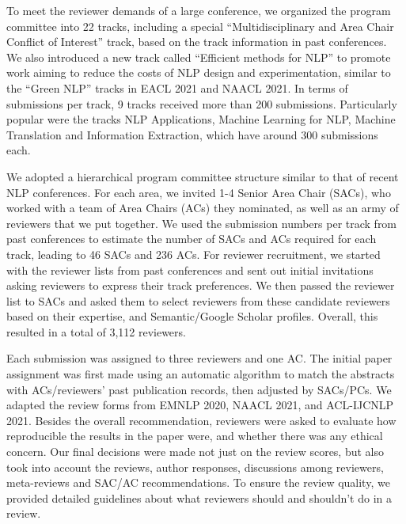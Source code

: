 To meet the reviewer demands of a large conference, we organized the program committee into 22 tracks, including a special ``Multidisciplinary and Area Chair Conflict of Interest'' track, based on the track information in past conferences. We also introduced a new track called ``Efficient methods for NLP'' to promote work aiming to reduce the costs of NLP design and experimentation, similar to the ``Green NLP'' tracks in EACL 2021 and NAACL 2021. In terms of submissions per track, 9 tracks received more than 200 submissions. Particularly popular were the tracks NLP Applications, Machine Learning for NLP, Machine Translation and Information Extraction, which have around 300 submissions each.

We adopted a hierarchical program committee structure similar to that of recent NLP conferences. For each area, we invited 1-4 Senior Area Chair (SACs), who worked with a team of Area Chairs (ACs) they nominated, as well as an army of reviewers that we put together. We used the submission numbers per track from past conferences to estimate the number of SACs and ACs required for each track, leading to 46 SACs and 236 ACs. For reviewer recruitment, we started with the reviewer lists from past conferences and sent out initial invitations asking reviewers to express their track preferences. We then passed the reviewer list to SACs and asked them to select reviewers from these candidate reviewers based on their expertise, and Semantic/Google Scholar profiles. Overall, this resulted in a total of 3,112 reviewers.

Each submission was assigned to three reviewers and one AC. The initial paper assignment was first made using an automatic algorithm to match the abstracts with ACs/reviewers' past publication records, then adjusted by SACs/PCs. We adapted the review forms from EMNLP 2020, NAACL 2021, and ACL-IJCNLP 2021. Besides the overall recommendation, reviewers were asked to evaluate how reproducible the results in the paper were, and whether there was any ethical concern. Our final decisions were made not just on the review scores, but also took into account the reviews, author responses, discussions among reviewers, meta-reviews and SAC/AC recommendations. To ensure the review quality, we provided detailed guidelines about what reviewers should and shouldn't do in a review.


